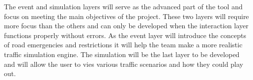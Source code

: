 \vspace{1em}
\noindent
The event and simulation layers will serve as the advanced part of the tool and focus on meeting the main objectives of the project. These two layers will require more focus than the others and can only be developed when the interaction layer functions properly without errors. As the event layer will introduce the concepts of road emergencies and restrictions it will help the team make a more realistic traffic simulation engine. The simulation will be the last layer to be developed and will allow the user to vies various traffic scenarios and how they could play out.  